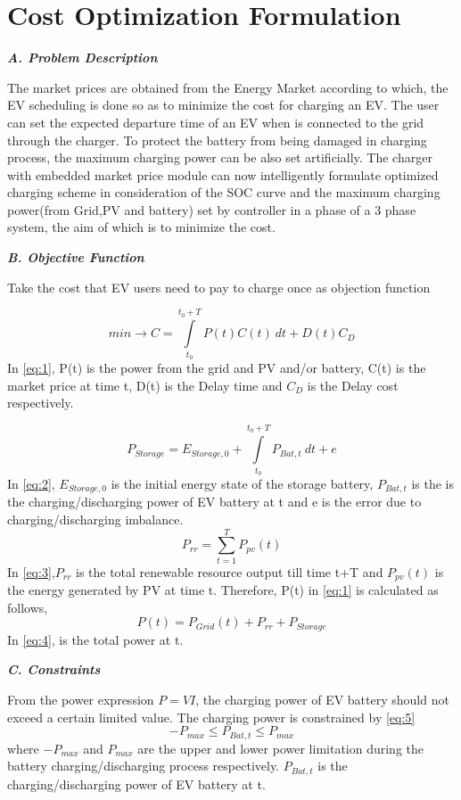 \chapter{Cost Optimization Formulation}\label{chap:Cost Optimization Formulation}

\textit{\textbf{A. Problem Description}}

The market prices are obtained from the Energy Market according to which, the EV scheduling is done so as to minimize the cost for charging an EV. The user can set the expected departure time of an EV when is connected to the grid through the charger. To protect the battery from being damaged in charging process,
the maximum charging power can be also set artificially. The charger with embedded market price module can now intelligently formulate optimized charging scheme in consideration of the SOC curve and the maximum charging power(from Grid,PV and battery) set by controller in a phase of a 3 phase system, the aim of which is to minimize the cost.

\textit{\textbf{B. Objective Function}}

Take the cost that EV users need to pay to charge once as objection function
 
 \[ min\rightarrow C = \int\limits_{t_0}^{t_0+T} P(t)C(t) \ dt + D(t){C_D} \tag{1} \label{eq:1}\]            
In \eqref{eq:1}, P(t) is the power from the grid and PV and/or battery, C(t) is the market price at time t, D(t) is the Delay time and \({C_D}\) is the Delay cost respectively.

\[{P_{Storage}} = {E_{Storage,0}}+\int\limits_{t_0}^{t_0+T} {P_{Bat,t}} \ dt + e \tag{2} \label{eq:2}\]
In \eqref{eq:2}, \({E_{Storage,0}}\) is the initial energy state of the storage battery, \({P_{Bat,t}}\) is the is the charging/discharging power of EV battery at t and e is the error due to charging/discharging imbalance.
\[{P_{rr}} = \sum\limits_{t=1}^{T} {P_{pv}(t)} \tag{3} \label{eq:3}\]
In \eqref{eq:3},\({P_{rr}}\)  is the total renewable resource output till time t+T and \({P_{pv}(t)}\) is the energy generated by PV at time t.
Therefore, P(t) in \eqref{eq:1} is calculated as follows,
\[P(t) = {P_{Grid}(t)}+{P_{rr}}+{P_{Storage}}\tag{4} \label{eq:4}\]
In \eqref{eq:4}, is the total power at t.

\textit{\textbf{C. Constraints}}

From the power expression \(P= VI\), the charging power of EV battery should not exceed a certain limited value. The charging power is constrained by \eqref{eq:5}
\[-{P_{max}}\leq {P_{Bat,t}} \leq {P_{max}}\tag{5} \label{eq:5}\]
where \(-{P_{max}}\) and \({P_{max}}\) are the upper and lower power limitation during the battery charging/discharging process respectively. \({P_{Bat,t}}\) is the charging/discharging power of EV battery at t. 

